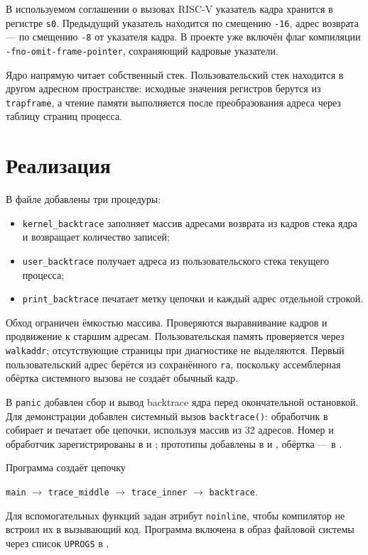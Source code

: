 \documentclass[12pt,a4paper]{article}
\begin{document}
В используемом соглашении о вызовах RISC-V указатель кадра хранится в регистре \texttt{s0}. Предыдущий указатель находится по смещению \texttt{-16}, адрес возврата --- по смещению \texttt{-8} от указателя кадра. В проекте уже включён флаг компиляции \texttt{-fno-omit-frame-pointer}, сохраняющий кадровые указатели.

Ядро напрямую читает собственный стек. Пользовательский стек находится в другом адресном пространстве: исходные значения регистров берутся из \texttt{trapframe}, а чтение памяти выполняется после преобразования адреса через таблицу страниц процесса.

\section{Реализация}

В файле  добавлены три процедуры:
\begin{itemize}
    \item \texttt{kernel\_backtrace} заполняет массив адресами возврата из кадров стека ядра и возвращает количество записей;
    \item \texttt{user\_backtrace} получает адреса из пользовательского стека текущего процесса;
    \item \texttt{print\_backtrace} печатает метку цепочки и каждый адрес отдельной строкой.
\end{itemize}

Обход ограничен ёмкостью массива. Проверяются выравнивание кадров и продвижение к старшим адресам. Пользовательская память проверяется через \texttt{walkaddr}; отсутствующие страницы при диагностике не выделяются. Первый пользовательский адрес берётся из сохранённого \texttt{ra}, поскольку ассемблерная обёртка системного вызова не создаёт обычный кадр.

В \texttt{panic} добавлен сбор и вывод backtrace ядра перед окончательной остановкой. Для демонстрации добавлен системный вызов \texttt{backtrace()}: обработчик в  собирает и печатает обе цепочки, используя массив из 32 адресов. Номер и обработчик зарегистрированы в  и ; прототипы добавлены в  и , обёртка --- в .

Программа  создаёт цепочку
\begin{center}
\texttt{main} $\rightarrow$ \texttt{trace\_middle} $\rightarrow$ \texttt{trace\_inner} $\rightarrow$ \texttt{backtrace}.
\end{center}
Для вспомогательных функций задан атрибут \texttt{noinline}, чтобы компилятор не встроил их в вызывающий код. Программа включена в образ файловой системы через список \texttt{UPROGS} в .
\end{document}
